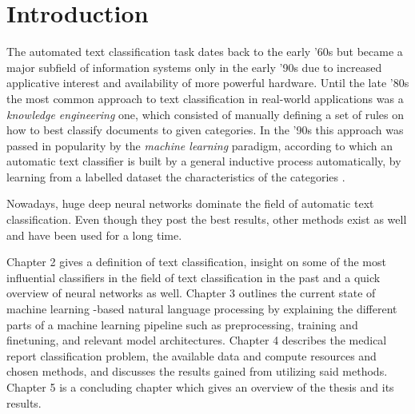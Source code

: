 \chapter{Introduction} \label{Introduction}
The automated text classification task dates back to the early '60s but became a major subfield of information systems only in the early '90s due to increased applicative interest and availability of more powerful hardware.
Until the late '80s the most common approach to text classification in real-world applications was a \textit{knowledge engineering} one, which consisted of manually defining a set of rules on how to best classify documents to given categories.
In the '90s this approach was passed in popularity by the \textit{machine learning} paradigm, according to which an automatic text classifier is built by a general inductive process automatically, by learning from a labelled dataset the characteristics of the categories \cite{sebastiani2002}.

Nowadays, huge deep neural networks dominate the field of automatic text classification. Even though they post the best results, other methods exist as well and have been used for a long time.



Chapter 2 gives a definition of text classification, insight on some of the most influential classifiers in the field of text classification in the past and a quick overview of neural networks as well.
Chapter 3 outlines the current state of machine learning -based natural language processing by explaining the different parts of a machine learning pipeline such as preprocessing, training and finetuning, and relevant model architectures.
Chapter 4 describes the medical report classification problem, the available data and compute resources and chosen methods, and discusses the results gained from utilizing said methods.
Chapter 5 is a concluding chapter which gives an overview of the thesis and its results.
